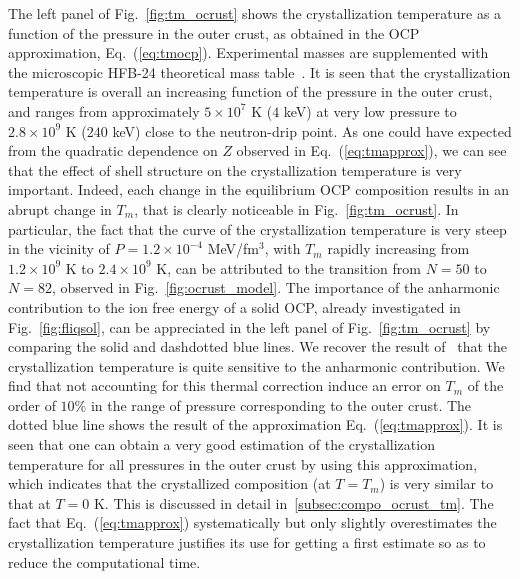 The left panel of Fig.~\ref{fig:tm_ocrust} shows the crystallization
temperature as a function of the pressure in the outer crust, as obtained in 
the OCP approximation, Eq.~(\ref{eq:tmocp}). 
Experimental masses are supplemented with the microscopic HFB-24 theoretical 
mass table~\cite{Goriely2013}. 
It is seen that the crystallization temperature is overall an increasing
function of the pressure in the outer crust, and ranges from approximately 
$5\times 10^7$ K ($4$ keV) at very low pressure to $2.8\times 10^9$ K ($240$ 
keV) close to the neutron-drip point.
As one could have expected from the quadratic dependence on $Z$ observed in 
Eq.~(\ref{eq:tmapprox}), we can see that the effect of shell structure on the 
crystallization temperature is very important. Indeed, each change in the 
equilibrium OCP composition results in an abrupt change in $T_m$, that is 
clearly noticeable in Fig.~\ref{fig:tm_ocrust}. In particular, the fact that 
the curve of the crystallization temperature is very steep in the vicinity of 
$P=1.2\times 10^{-4}$ MeV/fm$^3$, with $T_m$ rapidly increasing from 
$1.2\times 10^9$ K to $2.4\times 10^9$ K, can be attributed to the
transition from $N=50$ to $N=82$, observed in Fig.~\ref{fig:ocrust_model}.
The importance of the anharmonic contribution to the ion free energy of a 
solid OCP, already investigated in Fig.~\ref{fig:fliqsol}, can be appreciated 
in the left panel of Fig.~\ref{fig:tm_ocrust} by comparing the solid and 
dashdotted blue lines. We recover the result of~\cite{Fantina2020} that the 
crystallization temperature is quite sensitive to the anharmonic contribution.
We find that not accounting for this thermal correction induce an error on 
$T_m$ of the order of $10\%$ in the range of pressure corresponding to the 
outer crust.
The dotted blue line shows the result of the approximation 
Eq.~(\ref{eq:tmapprox}). It is seen that one can obtain a very good 
estimation of the crystallization temperature for all pressures in the outer 
crust by using this approximation, which indicates that the crystallized 
composition (at $T=T_m$) is very similar to that at $T=0$ K. This is discussed 
in detail in~\ref{subsec:compo_ocrust_tm}. The fact that 
Eq.~(\ref{eq:tmapprox}) systematically but only slightly overestimates the 
crystallization temperature justifies its use for getting a first estimate so 
as to reduce the computational time. 

